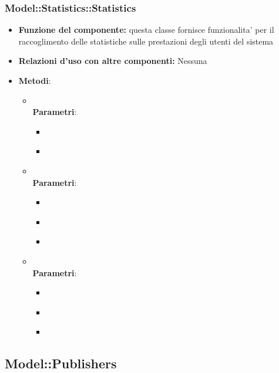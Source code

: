 \subsubsection{Model::Statistics::Statistics}
\begin{itemize}
\item\textbf{Funzione del componente:} questa classe fornisce funzionalita' per il raccoglimento delle statistiche sulle prestazioni degli utenti del sistema
\item\textbf{Relazioni d'uso con altre componenti:} Nessuna\\
\item\textbf{Metodi}:
\begin{itemize}
	\item{}\\
	\textbf{Parametri}:
	\begin{itemize}
		\item{}\\
		\item{}\\
	\end{itemize}
	\item{}\\
	\textbf{Parametri}:
	\begin{itemize}
		\item{}\\
		\item{}\\
		\item{}\\
	\end{itemize}
	\item{}\\
	\textbf{Parametri}:
	\begin{itemize}
		\item{}\\
		\item{}\\
		\item{}\\
	\end{itemize}
\end{itemize}
\end{itemize}

\subsection{Model::Publishers}
